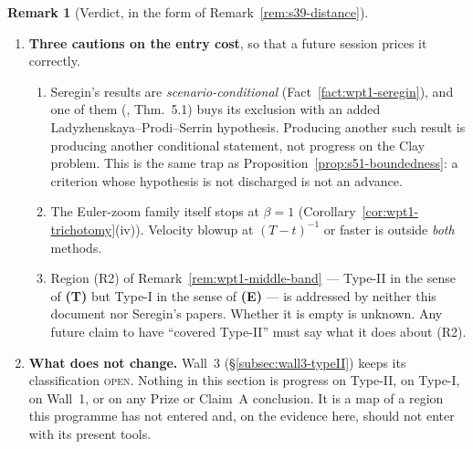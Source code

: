 \documentclass[11pt]{article}
\theoremstyle{definition}
\newtheorem{remark}[theorem]{Remark}
\theoremstyle{remark}
\newcommand{\R}{\mathbb{R}}
\begin{document}
\begin{remark}[Verdict, in the form of Remark~\ref{rem:s39-distance}]
\begin{enumerate}[label=(\arabic*)]
      to $\R^3$.
    \item \textbf{Three cautions on the entry cost}, so that a future session
      prices it correctly.
      \begin{enumerate}[label=\textup{(\alph*)},leftmargin=2.4em]
        \item Seregin's results are \emph{scenario-conditional}
          (Fact~\ref{fact:wpt1-seregin}), and one of them
          (\cite{Seregin2026Scenarios}, Thm.~5.1) buys its exclusion with an
          added Ladyzhenskaya--Prodi--Serrin hypothesis. Producing another
          such result is producing another conditional statement, not
          progress on the Clay problem. This is the same trap as
          Proposition~\ref{prop:s51-boundedness}: a criterion whose
          hypothesis is not discharged is not an advance.
        \item The Euler-zoom family itself stops at $\beta=1$
          (Corollary~\ref{cor:wpt1-trichotomy}(iv)). Velocity blowup at
          $(T-t)^{-1}$ or faster is outside \emph{both} methods.
        \item Region (R2) of Remark~\ref{rem:wpt1-middle-band} --- Type-II in
          the sense of \textbf{(T)} but Type-I in the sense of \textbf{(E)}
          --- is addressed by neither this document nor Seregin's papers.
          Whether it is empty is unknown. Any future claim to have
          ``covered Type-II'' must say what it does about (R2).
      \end{enumerate}
    \item \textbf{What does not change.} Wall~3
      (\S\ref{subsec:wall3-typeII}) keeps its classification
      \textsc{open}. Nothing in this section is progress on Type-II, on
      Type-I, on Wall~1, or on any Prize or Claim~A conclusion. It is a map
      of a region this programme has not entered and, on the evidence here,
      should not enter with its present tools.
  \end{enumerate}
\end{remark}
\end{document}
